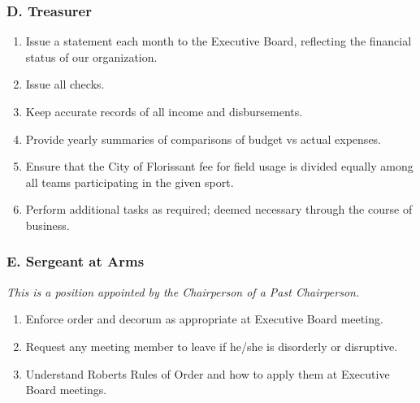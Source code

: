 \subsubsection{D. Treasurer}
\label{ssec:rules-g-3d}
\begin{enumerate}[1.]
    \item Issue a statement each month to the Executive Board, reflecting the financial status of our organization.
    \item Issue all checks.
    \item Keep accurate records of all income and disbursements.
    \item Provide yearly summaries of comparisons of budget vs actual expenses.
    \item Ensure that the City of Florissant fee for field usage is divided equally among all teams participating in the given sport.
    \item Perform additional tasks as required; deemed necessary through the course of business.
\end{enumerate}

\subsubsection{E. Sergeant at Arms}
\label{ssec:rules-g-3e}
{\em This is a position appointed by the Chairperson of a Past Chairperson.}
\begin{enumerate}[1.]
    \item Enforce order and decorum as appropriate at Executive Board meeting.
    \item Request any meeting member to leave if he/she is disorderly or disruptive.
    \item Understand Roberts Rules of Order and how to apply them at Executive Board meetings.
\end{enumerate}

